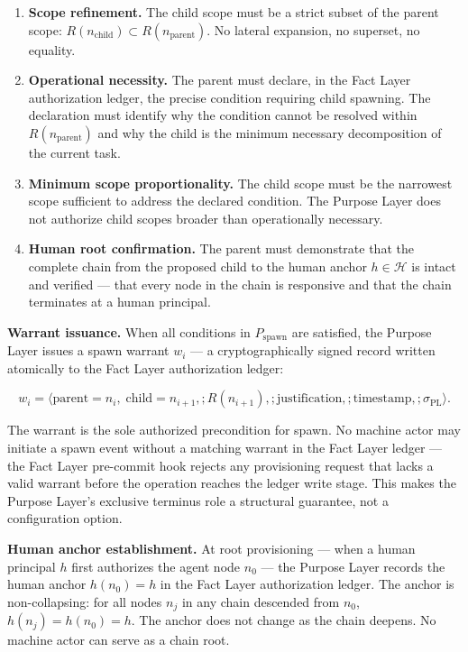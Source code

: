 \begin{enumerate}
    \item[(S1)] \textbf{Scope refinement.} The child scope must be a strict subset of the parent scope: $R(n_{\text{child}}) \subset R(n_{\text{parent}})$. No lateral expansion, no superset, no equality.

    \item[(S2)] \textbf{Operational necessity.} The parent must declare, in the Fact Layer authorization ledger, the precise condition requiring child spawning. The declaration must identify why the condition cannot be resolved within $R(n_{\text{parent}})$ and why the child is the minimum necessary decomposition of the current task.

    \item[(S3)] \textbf{Minimum scope proportionality.} The child scope must be the narrowest scope sufficient to address the declared condition. The Purpose Layer does not authorize child scopes broader than operationally necessary.

    \item[(S4)] \textbf{Human root confirmation.} The parent must demonstrate that the complete chain from the proposed child to the human anchor $h \in \mathcal{H}$ is intact and verified — that every node in the chain is responsive and that the chain terminates at a human principal.
\end{enumerate}

\medskip
\noindent\textbf{Warrant issuance.} When all conditions in $P_{\text{spawn}}$ are satisfied, the Purpose Layer issues a spawn warrant $w_i$ — a cryptographically signed record written atomically to the Fact Layer authorization ledger:

\begin{equation}
w_i = \bigl\langle
\text{parent}=n_i,\;
\text{child}=n_{i+1},;
R(n_{i+1}),;
\text{justification},;
\text{timestamp},;
\sigma_{\text{PL}}
\bigr\rangle .
\label{eq:spawn-warrant}
\end{equation}

The warrant is the sole authorized precondition for spawn. No machine actor may initiate a spawn event without a matching warrant in the Fact Layer ledger — the Fact Layer pre-commit hook rejects any provisioning request that lacks a valid warrant before the operation reaches the ledger write stage. This makes the Purpose Layer's exclusive terminus role a structural guarantee, not a configuration option.

\medskip
\noindent\textbf{Human anchor establishment.} At root provisioning — when a human principal $h$ first authorizes the agent node $n_0$ — the Purpose Layer records the human anchor $h(n_0) = h$ in the Fact Layer authorization ledger. The anchor is non-collapsing: for all nodes $n_j$ in any chain descended from $n_0$, $h(n_j) = h(n_0) = h$. The anchor does not change as the chain deepens. No machine actor can serve as a chain root.


